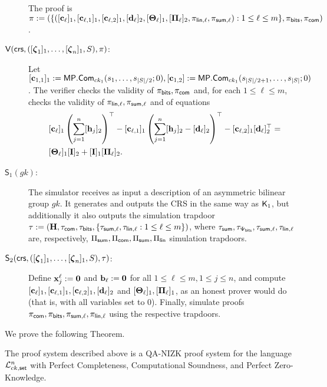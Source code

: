 \begin{description}
The proof is $\pi:=(\{([\mathbf{c}_\ell]_1,[\mathbf{c}_{\ell,1}]_1,[\mathbf{c}_{\ell,2}]_1,[\mathbf{d}_\ell]_2,[\mathbf{{\Theta}}_\ell]_1,[\mathbf{{\Pi}}_\ell]_2,\pi_{\mathsf{lin},\ell},\pi_{\mathsf{sum},\ell}):1\leq\ell\leq m\},\pi_{\mathsf{bits}},\pi_{\mathsf{com}})$.

\item[{$\mathsf{V}(\mathsf{crs},([{\boldsymbol \zeta}_1]_1, \ldots, [{\boldsymbol \zeta}_n]_1,S),\pi)$}:]
Let $[\mathbf{c}_{1,1}]_1:=\mathsf{MP}.\mathsf{Com}_{ck_1}(s_1,\ldots,s_{|S|/2};0),[\mathbf{c}_{1,2}]:=\mathsf{MP}.\mathsf{Com}_{ck_1}(s_{|S|/2+1},\ldots,s_{|S|};0)$. The verifier checks the validity of $\pi_{\mathsf{bits}},\pi_{\mathsf{com}}$ 
and, for each $1\leq \ell\leq m$, checks the validity of $\pi_{\mathsf{lin},\ell},\pi_{\mathsf{sum},\ell}$ and of equations
\begin{align}
&[\mathbf{c}_\ell]_1\left(\sum_{j=1}^n [\mathbf{h}_j]_2\right)^\top-
[\mathbf{c}_{\ell,1}]_1\left(\sum_{j=1}^n[\mathbf{h}_j]_2-[\mathbf{d}_\ell]_2\right)^\top-
[\mathbf{c}_{\ell,2}]_1[\mathbf{d}_\ell]_2^\top = \nonumber\\
&[\mathbf{{\Theta}}_\ell]_1[\mathbf{{I}}]_2+[\mathbf{{I}}]_1[\mathbf{{\Pi}}_\ell]_2.  \label{eq-alog-5}
\end{align}

\item[{$\mathsf{S}_1({gk})$:}] The simulator receives as input a description of an asymmetric bilinear group ${gk}$. It generates and outputs the CRS in the same way as $\mathsf{K}_1$, but additionally it also  outputs the simulation trapdoor 
$\tau:=(\mathbf{{H}},\tau_{\mathsf{com}},\tau_{\mathsf{bits}},\{\tau_{\mathsf{sum},\ell},\tau_{\mathsf{lin},\ell}:1\leq\ell\leq m\})$,
where $\tau_{\mathsf{sum}},\tau_{\Psi_{\mathsf{bits}}},\tau_{\mathsf{sum},\ell},\tau_{\mathsf{lin,\ell}}$ are, respectively, ${\Pi_{\mathsf{sum}}},{\Pi_{\mathsf{com}}},\Pi_{\mathsf{sum}},\Pi_\mathsf{lin}$ simulation trapdoors.

\item[{$\mathsf{S}_2(\mathsf{crs},([{\boldsymbol \zeta}_1]_1,\ldots,[{\boldsymbol \zeta}_n]_1,S),\tau)$:}] Define $\mathbf{x}^\ell_j:=\mathbf{0}$ and $\mathbf{b}_\ell:=\mathbf{0}$ for all $1\leq\ell\leq m, 1\leq j\leq n$, and compute $[\mathbf{c}_\ell]_1, [\mathbf{c}_{\ell,1}]_1,[\mathbf{c}_{\ell,2}]_1,[\mathbf{d}_\ell]_2$ and $[\mathbf{{\Theta}}_\ell]_1,[\mathbf{{\Pi}}_\ell]_1$, as an honest prover would do (that is, with all variables set to 0).
Finally, simulate proofs $\pi_{\mathsf{com}},\pi_{\mathsf{bits}},\pi_{\mathsf{sum},\ell},\pi_{\mathsf{lin},\ell}$ using the respective trapdoors.
\end{description}

We prove the following Theorem.

\begin{theorem} \label{theo:bits}
The proof system described above is a QA-NIZK proof system for the language $\mathcal{L}_{ck,\mathsf{set}}^n$
 with Perfect Completeness, Computational Soundness, and Perfect Zero-Knowledge.
\end{theorem}	

